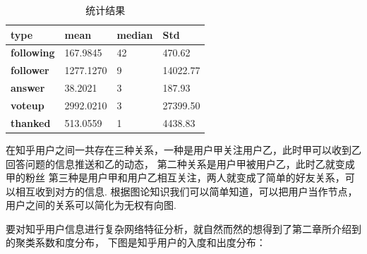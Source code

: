 \documentclass[bachelor,adobefonts]{jnuthesis}
\begin{document}
\begin{table}[ht]
  \centering
  \begin{tabular}{p{}<{\centering}p{}<{\centering}p{}<{\centering}p{}<{\centering}}
    \toprule
    \textbf{type } & \textbf{ mean } & \textbf{ median} & \textbf{ Std }\\
    \midrule
    \textbf{following}   &  167.9845     &   42   &   470.62  \\
    \textbf{follower}    &  1277.1270    &   9    &   14022.77\\
    \textbf{answer}      &  38.2021      &   3    &   187.93 \\
    \textbf{voteup}      &  2992.0210    &   3    &   27399.50  \\
    \textbf{thanked}     &  513.0559     &   1    &   4438.83\\
    \bottomrule
  \end{tabular}
  \caption{统计结果}
\end{table}


在知乎用户之间一共存在三种关系，一种是用户甲关注用户乙，此时甲可以收到乙回答问题的信息推送和乙的动态，
第二种关系是用户甲被用户乙，此时乙就变成甲的粉丝
第三种是用户甲和用户乙相互关注，两人就变成了简单的好友关系，可以相互收到对方的信息.
根据图论知识我们可以简单知道，可以把用户当作节点，
用户之间的关系可以简化为无权有向图. 

要对知乎用户信息进行复杂网络特征分析，就自然而然的想得到了第二章所介绍到的聚类系数和度分布，
下图是知乎用户的入度和出度分布：
\end{document}
